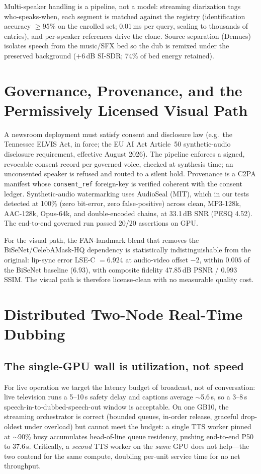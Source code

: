 \documentclass[11pt,a4paper]{article}
\begin{document}
Multi-speaker handling is a pipeline, not a model: streaming diarization tags who-speaks-when, each segment is matched against the registry (identification accuracy $\geq$95\% on the enrolled set; 0.01\,ms per query, scaling to thousands of entries), and per-speaker references drive the clone. Source separation (Demucs) isolates speech from the music/SFX bed so the dub is remixed under the preserved background ($+6$\,dB SI-SDR; 74\% of bed energy retained).

\section{Governance, Provenance, and the Permissively Licensed Visual Path}
\label{sec:gov}

A newsroom deployment must satisfy consent and disclosure law (e.g.\ the Tennessee ELVIS Act, in force; the EU AI Act Article~50 synthetic-audio disclosure requirement, effective August 2026). The pipeline enforces a signed, revocable consent record per governed voice, checked at synthesis time; an unconsented speaker is refused and routed to a silent hold. Provenance is a C2PA manifest whose \texttt{consent\_ref} foreign-key is verified coherent with the consent ledger. Synthetic-audio watermarking uses AudioSeal (MIT), which in our tests detected at 100\% (zero bit-error, zero false-positive) across clean, MP3-128k, AAC-128k, Opus-64k, and double-encoded chains, at 33.1\,dB SNR (PESQ 4.52). The end-to-end governed run passed 20/20 assertions on GPU.

For the visual path, the FAN-landmark blend that removes the BiSeNet/CelebAMask-HQ dependency is statistically indistinguishable from the original: lip-sync error LSE-C $=6.924$ at audio-video offset $-2$, within $0.005$ of the BiSeNet baseline ($6.93$), with composite fidelity 47.85\,dB PSNR / 0.993 SSIM. The visual path is therefore license-clean with no measurable quality cost.

\section{Distributed Two-Node Real-Time Dubbing}

\subsection{The single-GPU wall is utilization, not speed}

For live operation we target the latency budget of broadcast, not of conversation: live television runs a 5--10\,s safety delay and captions average $\sim$5.6\,s, so a 3--8\,s speech-in-to-dubbed-speech-out window is acceptable. On one GB10, the streaming orchestrator is correct (bounded queues, in-order release, graceful drop-oldest under overload) but cannot meet the budget: a single TTS worker pinned at $\sim$90\% busy accumulates head-of-line queue residency, pushing end-to-end P50 to 37.6\,s. Critically, a \emph{second} TTS worker on the \emph{same} GPU does not help---the two contend for the same compute, doubling per-unit service time for no net throughput.
\end{document}
